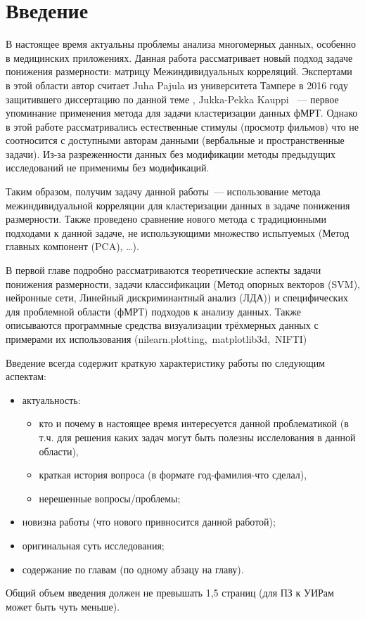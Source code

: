 \chapter*{Введение}
\label{sec:afterwords}

В настоящее время актуальны проблемы анализа многомерных данных, особенно в медицинских приложениях.
Данная работа рассматривает новый подход задаче понижения размерности: матрицу Межиндивидуальных корреляций. Экспертами в этой области автор считает Juha Pajula из университета Тампере в 2016 году защитившего диссертацию по данной теме \cite{pajula_ISC_thes}, Jukka-Pekka Kauppi \cite{kauppi2010clustering}~--- первое упоминание применения метода для задачи кластеризации данных фМРТ.
Однако в этой работе рассматривались естественные стимулы (просмотр фильмов) что не соотносится с доступными авторам данными (вербальные и пространственные задачи). Из-за разреженности данных без модификации методы
предыдущих исследований не применимы без модификаций.

Таким образом, получим задачу данной работы~--- использование метода межиндивидуальной корреляции для кластеризации данных в задаче понижения размерности. Также проведено сравнение нового метода с традиционными подходами к данной задаче, не использующими множество испытуемых (Метод главных компонент (PCA), \ldots).

В первой главе подробно рассматриваются теоретические аспекты задачи понижения размерности, задачи классификации (Метод опорных векторов (SVM), нейронные сети, Линейный дискриминантный анализ (ЛДА)) и специфических для проблемной области (фМРТ) подходов к анализу данных. Также описываются программные средства визуализации трёхмерных данных с примерами их использования (nilearn.plotting,~matplotlib3d,~NIFTI)


Введение всегда содержит краткую характеристику работы по следующим аспектам:

\begin{itemize}
	\item актуальность:
	\begin{itemize}
		\item кто и почему в настоящее время интересуется данной проблематикой (в т.ч. для решения каких задач могут быть полезны исслелования в данной области),
		\item краткая история вопроса (в формате год-фамилия-что сделал),
		\item нерешенные вопросы/проблемы;
	\end{itemize}
	\item новизна работы (что нового привносится данной работой);
	\item оригинальная суть исследования;
	\item содержание по главам (по одному абзацу на главу).
\end{itemize}

Общий объем введения должен не превышать 1,5 страниц (для ПЗ к УИРам может быть чуть меньше).


